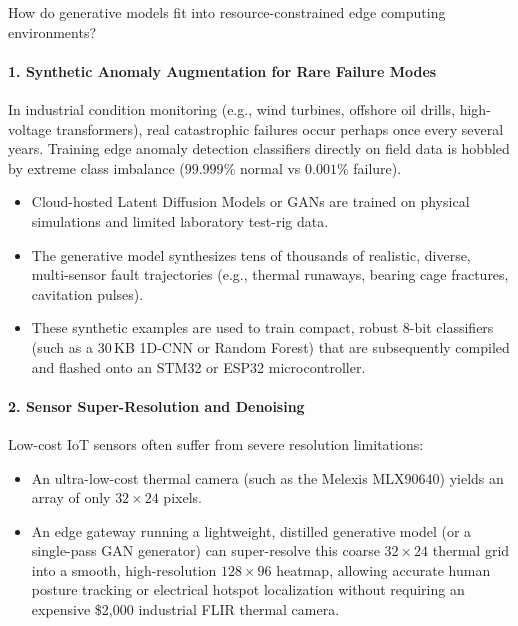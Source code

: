 \begin{iotbox}
How do generative models fit into resource-constrained edge computing environments?

\paragraph{1. Synthetic Anomaly Augmentation for Rare Failure Modes}
In industrial condition monitoring (e.g., wind turbines, offshore oil drills, high-voltage transformers), real catastrophic failures occur perhaps once every several years. Training edge anomaly detection classifiers directly on field data is hobbled by extreme class imbalance ($99.999\%$ normal vs $0.001\%$ failure). 
\begin{itemize}
    \item Cloud-hosted Latent Diffusion Models or GANs are trained on physical simulations and limited laboratory test-rig data.
    \item The generative model synthesizes tens of thousands of realistic, diverse, multi-sensor fault trajectories (e.g., thermal runaways, bearing cage fractures, cavitation pulses).
    \item These synthetic examples are used to train compact, robust 8-bit classifiers (such as a 30\,KB 1D-CNN or Random Forest) that are subsequently compiled and flashed onto an STM32 or ESP32 microcontroller.
\end{itemize}

\paragraph{2. Sensor Super-Resolution and Denoising}
Low-cost IoT sensors often suffer from severe resolution limitations:
\begin{itemize}
    \item An ultra-low-cost thermal camera (such as the Melexis MLX90640) yields an array of only $32 \times 24$ pixels.
    \item An edge gateway running a lightweight, distilled generative model (or a single-pass GAN generator) can super-resolve this coarse $32 \times 24$ thermal grid into a smooth, high-resolution $128 \times 96$ heatmap, allowing accurate human posture tracking or electrical hotspot localization without requiring an expensive \$2,000 industrial FLIR thermal camera.
\end{itemize}


\end{iotbox}
